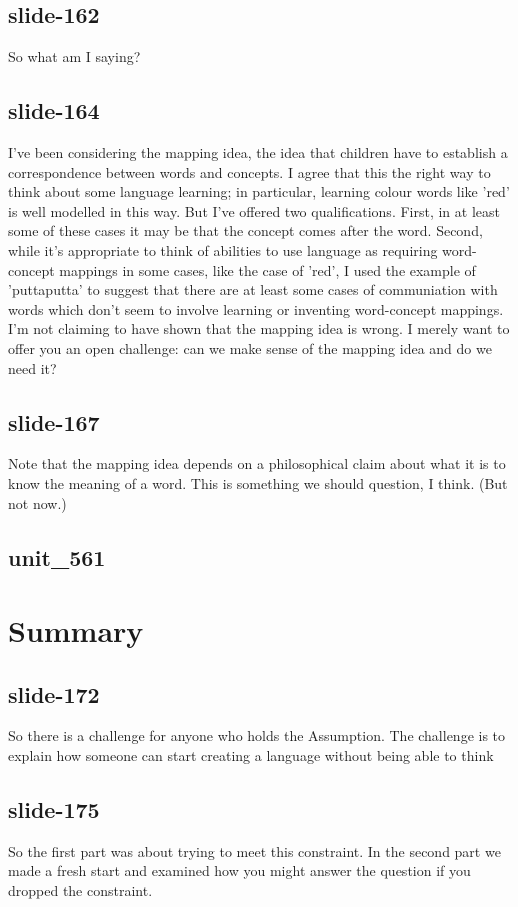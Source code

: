 \documentclass[12pt,\papersize]{extarticle}
\begin{document}
 
\subsection{slide-162}
So what am I saying?
 
 
\subsection{slide-164}
I've been considering the mapping idea, the idea that children have to establish a correspondence between words and concepts.
I agree that this the right way to think about some language learning; in particular, learning colour words like 'red' is well modelled in this way.
But I've offered two qualifications.
First, in at least some of these cases it may be that the concept comes after the word.
Second, while it's appropriate to think of abilities to use language as requiring word-concept mappings in some cases, like the case of 'red',
I used the example of 'puttaputta' to suggest that there are at least some cases of communiation with words which don't seem to involve learning or inventing word-concept mappings.
I'm not claiming to have shown that the mapping idea is wrong.
I merely want to offer you an open challenge: can we make sense of the mapping idea and do we need it?
 
 
\subsection{slide-167}
Note that the mapping idea depends on a philosophical claim about what it is to know the meaning of a word.
This is something we should question, I think. (But not now.)
 
 
\subsection{unit\_561}
 
\section{Summary}
 
 
\subsection{slide-172}
So there is a challenge for anyone who holds the Assumption.
The challenge is to explain how someone can start creating a language without being able to think
 
 
\subsection{slide-175}
So the first part was about trying to meet this constraint.
In the second part we made a fresh start and examined how you might answer the question if you dropped the constraint.
 
\end{document}
